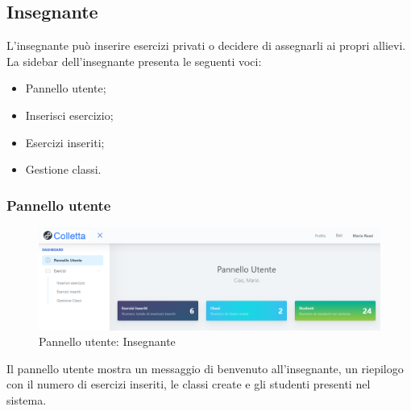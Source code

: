         
        
\newpage
    \subsection{Insegnante}
      L'insegnante può inserire esercizi privati o decidere di assegnarli ai propri allievi. 
         \\La sidebar dell'insegnante presenta le seguenti voci:
        	\begin{itemize}
            	\item Pannello utente;
            	\item Inserisci esercizio;
            	\item Esercizi inseriti;
            	\item Gestione classi.
        	\end{itemize}
        
        
        
        \subsubsection{Pannello utente}
        \begin{figure}[H]
        		\centering
        		\includegraphics[width=1\linewidth]{sez/img/insegnante/panelloutente.PNG} 
        		\caption{Pannello utente: Insegnante}\label{fig:1}
    		\end{figure}
          Il pannello utente mostra un messaggio di benvenuto all'insegnante, un riepilogo con il numero di esercizi inseriti, le classi create e gli studenti presenti nel sistema.
        
        \newpage
